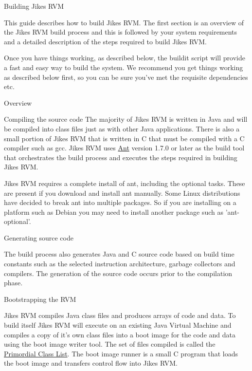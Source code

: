 \begin{section}{Building Jikes RVM}

This guide describes how to build Jikes RVM. The first section is an overview of the Jikes RVM build process and this is followed by your system requirements and a detailed description of the steps required to build Jikes RVM.

Once you have things working, as described below, the buildit  script will provide a fast and easy way to build the system.  We recommend you get things working as described below first, so you can be sure you've met the requisite dependencies etc.

\begin{subsection}{Overview}

\begin{subsubsection}{Compiling the source code}
The majority of Jikes RVM is written in Java and will be compiled into class files just as with other Java applications. There is also a small portion of Jikes RVM that is written in C that must be compiled with a C compiler such as gcc.  Jikes RVM uses \href{https://ant.apache.org}{Ant} version 1.7.0 or later as the build tool that orchestrates the build process and executes the steps required in building Jikes RVM.

Jikes RVM requires a complete install of ant, including the optional tasks. These are present if you download and install ant manually. Some Linux distributions have decided to break ant into multiple packages. So if you are installing on a platform such as Debian you may need to install another package such as 'ant-optional'.
\end{subsubsection}

\begin{subsubsection}{Generating source code}

The build process also generates Java and C source code based on build time constants such as the selected instruction architecture, garbage collectors and compilers. The generation of the source code occurs prior to the compilation phase.

\end{subsubsection}

\begin{subsubsection}{Bootstrapping the RVM}

Jikes RVM compiles Java class files and produces arrays of code and data. To build itself Jikes RVM will execute on an existing Java Virtual Machine and compiles a copy of it's own class files into a boot image for the code and data using the boot image writer tool. The set of files compiled is called the \hyperref[sec:primordialclasslist]{Primordial Class List}. The boot image runner is a small C program that loads the boot image and transfers control flow into Jikes RVM.


\end{subsubsection}
\end{subsection}
\end{section}

